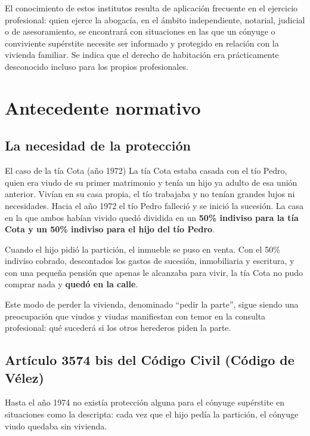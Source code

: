 \documentclass[12pt,oneside]{book}
\begin{document}
\begin{note}
El conocimiento de estos institutos resulta de aplicación frecuente en el ejercicio profesional: quien ejerce la abogacía, en el ámbito independiente, notarial, judicial o de asesoramiento, se encontrará con situaciones en las que un cónyuge o conviviente supérstite necesite ser informado y protegido en relación con la vivienda familiar. Se indica que el derecho de habitación era prácticamente desconocido incluso para los propios profesionales.
\end{note}

\section{Antecedente normativo}

\subsection{La necesidad de la protección}

\begin{example}{El caso de la tía Cota (año 1972)}
La tía Cota estaba casada con el tío Pedro, quien era viudo de su primer matrimonio y tenía un hijo ya adulto de esa unión anterior. Vivían en su casa propia, el tío trabajaba y no tenían grandes lujos ni necesidades. Hacia el año 1972 el tío Pedro falleció y se inició la sucesión. La casa en la que ambos habían vivido quedó dividida en un \textbf{50\% indiviso para la tía Cota y un 50\% indiviso para el hijo del tío Pedro}.

Cuando el hijo pidió la partición, el inmueble se puso en venta. Con el 50\% indiviso cobrado, descontados los gastos de sucesión, inmobiliaria y escritura, y con una pequeña pensión que apenas le alcanzaba para vivir, la tía Cota no pudo comprar nada y \textbf{quedó en la calle}.
\end{example}

Este modo de perder la vivienda, denominado ``pedir la parte'', sigue siendo una preocupación que viudos y viudas manifiestan con temor en la consulta profesional: qué sucederá si los otros herederos piden la parte.

\subsection{Artículo 3574 bis del Código Civil (Código de Vélez)}

Hasta el año 1974 no existía protección alguna para el cónyuge supérstite en situaciones como la descripta: cada vez que el hijo pedía la partición, el cónyuge viudo quedaba sin vivienda.
\end{document}
